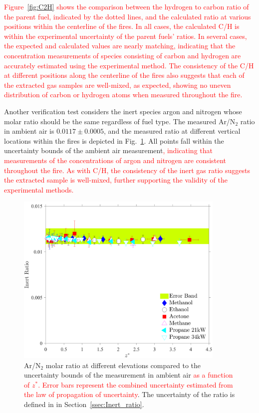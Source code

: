 \documentclass[12pt]{article}
\begin{document}
\textcolor{red}{Figure~\ref{fig:C2H} shows the comparison between the hydrogen to carbon ratio of the parent fuel, indicated by the dotted lines, and the calculated ratio at various positions within the centerline of the fires. In all cases, the calculated C/H is within the experimental uncertainty of the parent fuels' ratios. In several cases, the expected and calculated values are nearly matching, indicating that the concentration measurements of species consisting of carbon and hydrogen are accurately estimated using the experimental method. The consistency of the {C}/{H} at different positions along the centerline of the fires also suggests that each of the extracted gas samples are well-mixed, as expected, showing no uneven distribution of carbon or hydrogen atoms when measured throughout the fire.}

Another verification test considers the inert species argon and nitrogen whose molar ratio should be the same regardless of fuel type. The measured Ar/N$_2$ ratio in ambient air is $0.0117\pm0.0005$, and the measured ratio at different vertical locations within the fires is depicted in Fig.~\ref{fig:IR}. All points fall within the uncertainty bounds of the ambient air measurement\textcolor{red}{, indicating that measurements of the concentrations of argon and nitrogen are consistent throughout the fire. As with {C}/{H}, the consistency of the inert gas ratio suggests the extracted sample is well-mixed, further supporting the validity of the experimental methods.}

\begin{figure}[h!]
	\centering
\includegraphics[width=10.0cm, keepaspectratio]{Inert_ratio_Comparison.pdf}
	\caption[Ar/N$_2$ ratio within the fire envelop compared to ambient air]{Ar/N$_2$ molar ratio at different elevations compared to the uncertainty bounds of the measurement in ambient air \textcolor{red}{ as a function of $z^*$. Error bars represent the combined uncertainty estimated from the law of propagation of uncertainty}. The uncertainty of the ratio is defined in in Section~\ref{ssec:Inert_ratio}.}
	\label{fig:IR}
\end{figure}
\clearpage
\end{document}
